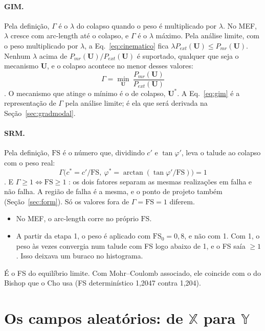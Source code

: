 \documentclass[11pt,a4paper]{article}
\newcommand{\X}{\mathbb{X}}
\newcommand{\Y}{\mathbb{Y}}
\newcommand{\FS}{\mathrm{FS}}
\begin{document}
\paragraph{GIM.} Pela definição, $\Gamma$ é o $\lambda$ do colapso quando o peso é multiplicado por $\lambda$. No MEF,
$\lambda$ cresce com arc-length até o colapso, e $\Gamma$ é o $\lambda$ máximo. Pela análise limite, com o peso
multiplicado por $\lambda$, a Eq.~\eqref{eq:cinematico} fica $\lambda P_{ext}(\bm U) \le P_{mr}(\bm U)$. Nenhum $\lambda$
acima de $P_{mr}(\bm U)/P_{ext}(\bm U)$ é suportado, qualquer que seja o mecanismo $\bm U$, e o colapso acontece no menor
desses valores:
\begin{equation}
  \Gamma = \min_{\bm U}\ \frac{P_{mr}(\bm U)}{P_{ext}(\bm U)}
  \label{eq:gim}
\end{equation}
\citep[Eqs.~54 e 55]{ceron2025}. O mecanismo que atinge o mínimo é o de colapso, $\bm U^*$. A Eq.~\eqref{eq:gim} é a
representação de $\Gamma$ pela análise limite; é ela que será derivada na Seção~\ref{sec:gradmodal}.

\paragraph{SRM.} Pela definição, $\FS$ é o número que, dividindo $c'$ e $\tan\varphi'$, leva o talude ao colapso com o
peso real:
\begin{equation}
  \Gamma\big(c^* = c'/\FS,\ \varphi^* = \arctan(\tan\varphi'/\FS)\big) = 1
  \label{eq:srm}
\end{equation}
\citep[Eq.~58]{ceron2025}. E $\Gamma \ge 1 \Leftrightarrow \FS \ge 1$ \citep[Eq.~57]{ceron2025}: os dois fatores separam
as mesmas realizações em falha e não falha. A região de falha é a mesma, e o ponto de projeto também
(Seção~\ref{sec:form}). Só os valores fora de $\Gamma = \FS = 1$ diferem.
\begin{itemize}
  \item No MEF, o arc-length corre no próprio $\FS$.
  \item A partir da etapa 1, o peso é aplicado com $\FS_0 = 0{,}8$, e não com 1. Com 1, o peso às vezes convergia num
    talude com FS logo abaixo de 1, e o FS saía $\ge 1$. Isso deixava um buraco no histograma.
\end{itemize}
É o FS do equilíbrio limite. Com Mohr--Coulomb associado, ele coincide com o do Bishop que o Cho usa (FS determinístico
1,2047 contra 1,204).

\section{Os campos aleatórios: de $\X$ para $\Y$}\label{sec:kl}
\end{document}
